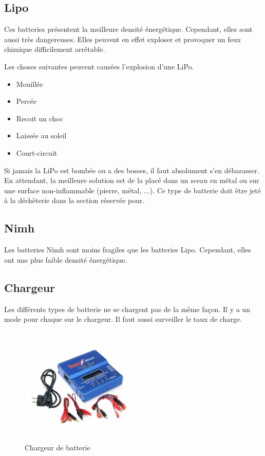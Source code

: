 \documentclass[a4paper, 11pt]{report}
\begin{document}
\subsection{Lipo}
Ces batteries présentent la meilleure densité énergétique. Cependant, elles sont aussi très dangereuses. Elles peuvent en effet exploser et provoquer un feux chimique difficilement arrêtable.

Les choses suivantes peuvent causées l'explosion d'une LiPo.
\begin{itemize}
\item Mouillée
\item Percée
\item Recoit un choc
\item Laissée au soleil
\item Court-circuit
\end{itemize}

Si jamais la LiPo est bombée ou a des bosses, il faut absolument s'en débarasser. En attendant, la meilleure solution est de la placé dans un sceau en métal ou sur une surface non-inflammable (pierre, métal, ...). Ce type de batterie doit être jeté à la déchèterie dans la section réservée pour.

\subsection{Nimh}
Les batteries Nimh sont moins fragiles que les batteries Lipo. Cependant, elles ont une plus faible densité énergétique.

\subsection{Chargeur}
Les différents types de batterie ne se chargent pas de la même façon. Il y a un mode pour chaque sur le chargeur. Il faut aussi surveiller le taux de charge.

\begin{figure}[h!]
\begin{centering}
\includegraphics[width=0.5\textwidth]{images/chargeurBatterie.jpg}
\caption{Chargeur de batterie}
\par\end{centering}
\end{figure}
\end{document}
